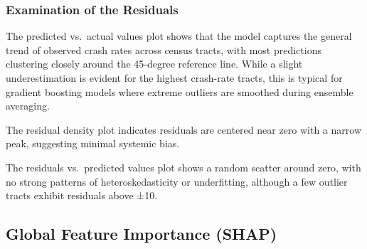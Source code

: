 \documentclass[
  number,
  review,
  3p]{elsarticle}
\begin{document}
\subsubsection{\texorpdfstring{\textbf{Examination of the
Residuals}}{Examination of the Residuals}}\label{examination-of-the-residuals}

The predicted vs.~actual values plot shows that the model captures the
general trend of observed crash rates across census tracts, with most
predictions clustering closely around the 45-degree reference line.
While a slight underestimation is evident for the highest crash-rate
tracts, this is typical for gradient boosting models where extreme
outliers are smoothed during ensemble averaging.

The residual density plot indicates residuals are centered near zero
with a narrow peak, suggesting minimal systemic bias.

The residuals vs.~predicted values plot shows a random scatter around
zero, with no strong patterns of heteroskedasticity or underfitting,
although a few outlier tracts exhibit residuals above ±10.

\subsection{\texorpdfstring{\textbf{Global Feature Importance
(SHAP)}}{Global Feature Importance (SHAP)}}\label{global-feature-importance-shap}
\end{document}
